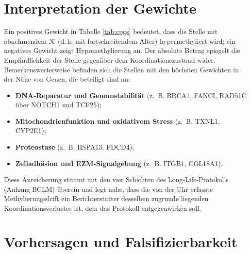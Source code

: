 \documentclass[12pt,a4paper]{article}
\newcommand{\REL}{\mathcal{K}}          %
\begin{document}
	\section{Interpretation der Gewichte}
	\label{sec:weights}
	Ein positives Gewicht in Tabelle \ref{tab:cpgs} bedeutet, dass die Stelle mit abnehmendem \(\REL\) (d.\,h. mit fortschreitendem Alter) hypermethyliert wird; ein negatives Gewicht zeigt Hypomethylierung an. Der absolute Betrag spiegelt die Empfindlichkeit der Stelle gegenüber dem Koordinationszustand wider. Bemerkenswerterweise befinden sich die Stellen mit den höchsten Gewichten in der Nähe von Genen, die beteiligt sind an:
	\begin{itemize}
		\item \textbf{DNA‑Reparatur und Genomstabilität} (z.~B. BRCA1, FANCI, RAD51C über NOTCH1 und TCF25);
		\item \textbf{Mitochondrienfunktion und oxidativem Stress} (z.~B. TXNL1, CYP2E1);
		\item \textbf{Proteostase} (z.~B. HSPA13, PDCD4);
		\item \textbf{Zelladhäsion und EZM‑Signalgebung} (z.~B. ITGB1, COL18A1).
	\end{itemize}
	Diese Anreicherung stimmt mit den vier Schichten des Long‑Life‑Protokolls (Anhang BCLM) überein und legt nahe, dass die von der Uhr erfasste Methylierungsdrift ein Berichterstatter desselben zugrunde liegenden Koordinationsverlustes ist, dem das Protokoll entgegenwirken soll.
	
	\section{Vorhersagen und Falsifizierbarkeit}
	\label{sec:predictions}
	
\end{document}
